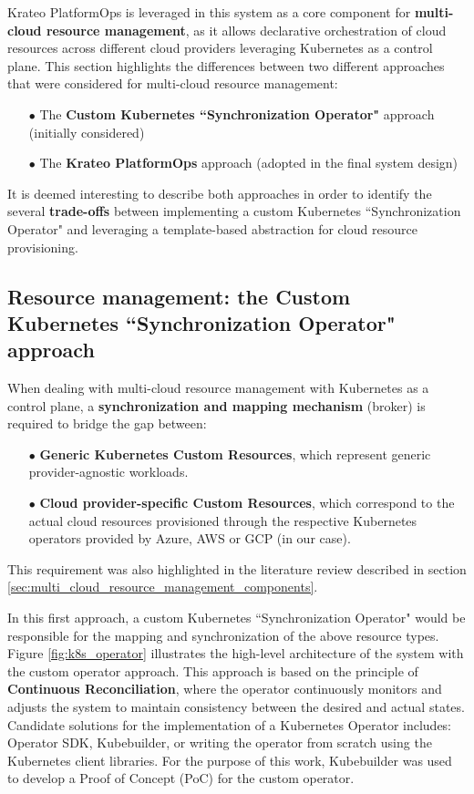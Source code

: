 Krateo PlatformOps is leveraged in this system as a core component for \textbf{multi-cloud resource management}, as it allows declarative orchestration of cloud resources across different cloud providers leveraging Kubernetes as a control plane. 
This section highlights the differences between two different approaches that were considered for multi-cloud resource management:
\begin{itemize}[itemsep=0.2pt, topsep=1pt]
  \item[$\bullet$] The \textbf{Custom Kubernetes ``Synchronization Operator"} approach (initially considered)
  \item[$\bullet$] The \textbf{Krateo PlatformOps} approach (adopted in the final system design) \\
\end{itemize}

It is deemed interesting to describe both approaches in order to identify the several \textbf{trade-offs} between implementing a custom Kubernetes ``Synchronization Operator" and leveraging a template-based abstraction for cloud resource provisioning.

\subsection{Resource management: the Custom Kubernetes ``Synchronization Operator" approach}

When dealing with multi-cloud resource management with Kubernetes as a control plane, a \textbf{synchronization and mapping mechanism} (broker) is required to bridge the gap between:
\begin{itemize}[itemsep=0.2pt, topsep=1pt]
  \item[$\bullet$] \textbf{Generic Kubernetes Custom Resources}, which represent generic provider-agnostic workloads.
  \item[$\bullet$] \textbf{Cloud provider-specific Custom Resources}, which correspond to the actual cloud resources provisioned through the respective Kubernetes operators provided by Azure, AWS or GCP (in our case).
\end{itemize}
This requirement was also highlighted in the literature review described in section \ref{sec:multi_cloud_resource_management_components}.

In this first approach, a custom Kubernetes ``Synchronization Operator" would be responsible for the mapping and synchronization of the above resource types. 
Figure \ref{fig:k8s_operator} illustrates the high-level architecture of the system with the custom operator approach.
This approach is based on the principle of \textbf{Continuous Reconciliation}, where the operator continuously monitors and adjusts the system to maintain consistency between the desired and actual states.
Candidate solutions for the implementation of a Kubernetes Operator includes: Operator SDK, Kubebuilder, or writing the operator from scratch using the Kubernetes client libraries. 
For the purpose of this work, Kubebuilder was used to develop a Proof of Concept (PoC) for the custom operator.

